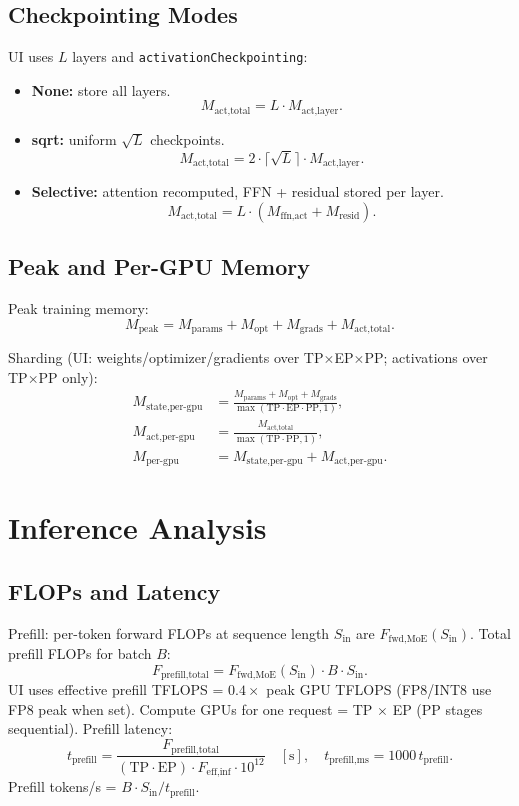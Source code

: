 \documentclass[11pt]{article}
\begin{document}
\subsection{Checkpointing Modes}

UI uses $L$ layers and \texttt{activationCheckpointing}:
\begin{itemize}
  \item \textbf{None:} store all layers.
  \[
  M_{\text{act,total}} = L \cdot M_{\text{act,layer}}.
  \]

  \item \textbf{sqrt:} uniform $\sqrt{L}$ checkpoints.
  \[
  M_{\text{act,total}} = 2 \cdot \lceil \sqrt{L} \rceil \cdot M_{\text{act,layer}}.
  \]

  \item \textbf{Selective:} attention recomputed, FFN + residual stored per layer.
  \[
  M_{\text{act,total}} = L \cdot (M_{\text{ffn,act}} + M_{\text{resid}}).
  \]
\end{itemize}

\subsection{Peak and Per-GPU Memory}

Peak training memory:
\[
M_{\text{peak}} = M_{\text{params}} + M_{\text{opt}} + M_{\text{grads}} + M_{\text{act,total}}.
\]

Sharding (UI: weights/optimizer/gradients over TP$\times$EP$\times$PP; activations over TP$\times$PP only):
\begin{align*}
M_{\text{state,per-gpu}} &=
\frac{M_{\text{params}} + M_{\text{opt}} + M_{\text{grads}}}
{\max(\mathrm{TP} \cdot \mathrm{EP} \cdot \mathrm{PP}, 1)},\\
M_{\text{act,per-gpu}} &=
\frac{M_{\text{act,total}}}{\max(\mathrm{TP} \cdot \mathrm{PP}, 1)}, \\
M_{\text{per-gpu}} &= M_{\text{state,per-gpu}} + M_{\text{act,per-gpu}}.
\end{align*}

\section{Inference Analysis}

\subsection{FLOPs and Latency}

Prefill: per-token forward FLOPs at sequence length $S_{\text{in}}$ are $F_{\text{fwd,MoE}}(S_{\text{in}})$. Total prefill FLOPs for batch $B$:
\[
F_{\text{prefill,total}} = F_{\text{fwd,MoE}}(S_{\text{in}}) \cdot B \cdot S_{\text{in}}.
\]
UI uses effective prefill TFLOPS = $0.4 \times$ peak GPU TFLOPS (FP8/INT8 use FP8 peak when set). Compute GPUs for one request = TP $\times$ EP (PP stages sequential). Prefill latency:
\[
t_{\text{prefill}} = \frac{F_{\text{prefill,total}}}{(\mathrm{TP} \cdot \mathrm{EP}) \cdot F_{\text{eff,inf}} \cdot 10^{12}}
\quad [\text{s}],
\quad
t_{\text{prefill,ms}} = 1000 \, t_{\text{prefill}}.
\]
Prefill tokens/s = $B \cdot S_{\text{in}} / t_{\text{prefill}}$.
\end{document}
